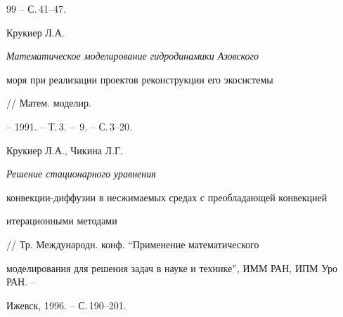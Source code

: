 \begin{thebibliography}{99}
-- С.\,41--47. 







Крукиер Л.А. {\em Математическое моделирование гидродинамики Азовского 


моря при реализации проектов реконструкции его экосистемы} // Матем. моделир. 


-- 1991. -- Т.\,3. -- \No\,9. -- С.\,3--20. 







Крукиер Л.А., Чикина Л.Г. {\em Решение стационарного уравнения 


конвекции-диффузии в несжимаемых средах с преобладающей конвекцией 


итерационными методами} // Тр. Международн. конф. ``Применение математического 


моделирования для решения задач в науке и технике'', ИММ РАН, ИПМ Уро РАН. -- 


Ижевск, 1996. -- С.\,190--201. 


 


\end{thebibliography} 


 


\vskip 2cm 


 






 


 


 



